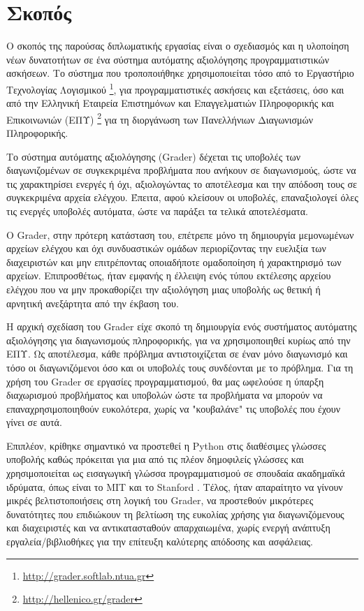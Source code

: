 \documentclass[diploma]{softlab-thesis}
\begin{document}
\section{Σκοπός}

Ο σκοπός της παρούσας διπλωματικής εργασίας είναι ο σχεδιασμός και η υλοποίηση
νέων δυνατοτήτων σε ένα σύστημα αυτόματης αξιολόγησης προγραμματιστικών
ασκήσεων. Το σύστημα που τροποποιήθηκε χρησιμοποιείται τόσο από το Εργαστήριο
Τεχνολογίας Λογισμικού \footnote{\url{http://grader.softlab.ntua.gr}}, για
προγραμματιστικές ασκήσεις και εξετάσεις, όσο και από την Ελληνική Εταιρεία
Επιστημόνων και Επαγγελματιών Πληροφορικής και Επικοινωνιών (ΕΠΥ)
\footnote{\url{http://hellenico.gr/grader}} για τη διοργάνωση των Πανελλήνιων
Διαγωνισμών Πληροφορικής.

\bigskip

Το σύστημα αυτόματης αξιολόγησης (Grader) δέχεται τις υποβολές των
διαγωνιζομένων σε συγκεκριμένα προβλήματα που ανήκουν σε διαγωνισμούς, ώστε να
τις χαρακτηρίσει ενεργές ή όχι, αξιολογώντας το αποτέλεσμα και την απόδοση τους
σε συγκεκριμένα αρχεία ελέγχου. Έπειτα, αφού κλείσουν οι υποβολές,
επαναξιολογεί όλες τις ενεργές υποβολές αυτόματα, ώστε να παράξει τα τελικά
αποτελέσματα.

\bigskip

Ο Grader, στην πρότερη κατάσταση του, επέτρεπε μόνο τη δημιουργία μεμονωμένων
αρχείων ελέγχου και όχι συνδυαστικών ομάδων περιορίζοντας την ευελιξία των
διαχειριστών και μην επιτρέποντας οποιαδήποτε ομαδοποίηση ή χαρακτηρισμό των
αρχείων. Επιπροσθέτως, ήταν εμφανής η έλλειψη ενός τύπου εκτέλεσης αρχείου ελέγχου
που να μην προκαθορίζει την αξιολόγηση μιας υποβολής ως θετική ή αρνητική ανεξάρτητα
από την έκβαση του.

\bigskip

Η αρχική σχεδίαση του Grader είχε σκοπό τη δημιουργία ενός συστήματος αυτόματης
αξιολόγησης για διαγωνισμούς πληροφορικής, για να χρησιμοποιηθεί κυρίως από την
ΕΠΥ. Ως αποτέλεσμα, κάθε πρόβλημα αντιστοιχίζεται σε έναν μόνο διαγωνισμό και τόσο
οι διαγωνιζόμενοι όσο και οι υποβολές τους συνδέονται με το πρόβλημα. Για τη χρήση
του Grader σε εργασίες προγραμματισμού, θα μας ωφελούσε η ύπαρξη διαχωρισμού
προβλήματος και υποβολών ώστε τα προβλήματα να μπορούν να επαναχρησιμοποιηθούν
ευκολότερα, χωρίς να "κουβαλάνε" τις υποβολές που έχουν γίνει σε αυτά.

\bigskip

Επιπλέον, κρίθηκε σημαντικό να προστεθεί η Python στις διαθέσιμες γλώσσες
υποβολής καθώς πρόκειται για μια από τις πλέον δημοφιλείς γλώσσες και
χρησιμοποιείται ως εισαγωγική γλώσσα προγραμματισμού σε σπουδαία ακαδημαϊκά
ιδρύματα, όπως είναι το MIT και το Stanford \cite{popularpython}.
Τέλος, ήταν απαραίτητο να γίνουν μικρές βελτιστοποιήσεις στη λογική του Grader,
να προστεθούν μικρότερες δυνατότητες που επιδιώκουν τη βελτίωση της ευκολίας
χρήσης για διαγωνιζόμενους και διαχειριστές και να αντικατασταθούν
απαρχαιωμένα, χωρίς ενεργή ανάπτυξη εργαλεία/βιβλιοθήκες για την επίτευξη
καλύτερης απόδοσης και ασφάλειας.
\end{document}
